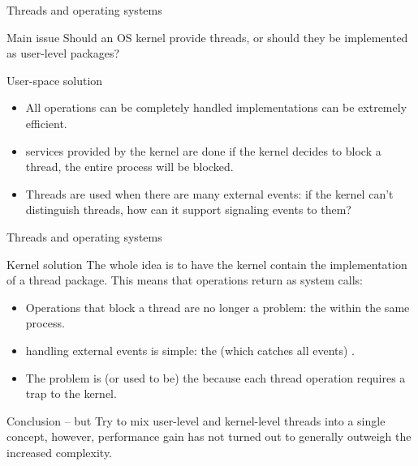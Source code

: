 \begin{slide}{Threads and operating systems}
  \begin{alertblock}{Main issue} 
    Should an OS kernel provide threads, or should they be implemented as user-level packages?
  \end{alertblock}
  \begin{block}{User-space solution}
    \begin{itemize}
    \item All operations can be completely handled  \mathexpr{\Rightarrow}
      implementations can be extremely efficient.
    \item {} services provided by the kernel are done  \mathexpr{\Rightarrow} if the kernel decides to block a thread, the entire process will be
      blocked.
    \item Threads are used when there are many external events: 
      \mathexpr{\Rightarrow} if the kernel can't distinguish threads, how can it support signaling events to
      them?
    \end{itemize}
  \end{block}
\end{slide}
\begin{slide}{Threads and operating systems}
  \begin{block}{Kernel solution}
    The whole idea is to have the kernel contain the implementation of a thread package. This means that
     operations return as system calls:
    \begin{itemize}
    \item Operations that block a thread are no longer a problem: the  within the same process.
    \item handling external events is simple: the  (which catches all events) .
    \item The problem is (or used to be) the  because each thread
      operation requires a trap to the kernel.
    \end{itemize}
  \end{block}
  \begin{alertblock}{Conclusion -- but} 
    Try to mix user-level and kernel-level threads into a single concept, however, performance gain has not
    turned out to generally outweigh the increased complexity.
  \end{alertblock}
\end{slide}
